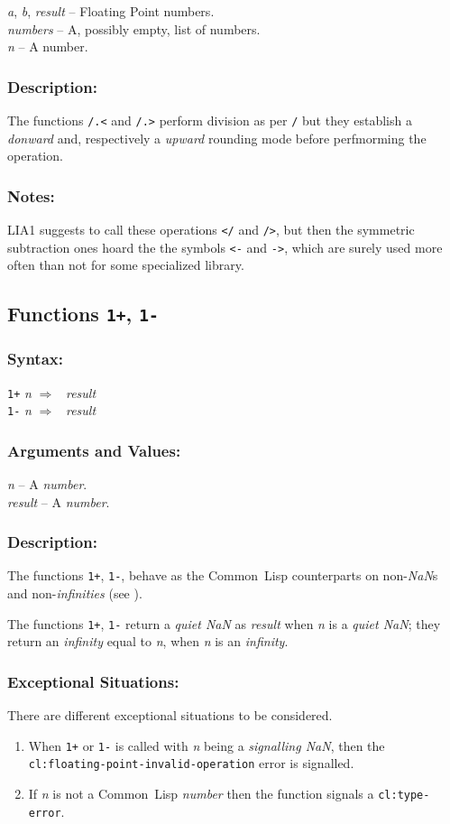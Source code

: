 \documentclass[10pt,fleqn]{article}
\newcommand{\CL}{\textsf{Common~Lisp}}
\newcommand{\code}[1]{\texttt{#1}}
\newcommand{\clieeeterm}[1]{\textit{#1}}
\newcommand{\varname}[1]{\textit{#1}}
\newcommand{\clterm}[1]{\textit{#1}}
\newcommand{\clname}[1]{\texttt{#1}}
\newcommand{\RArrow}{$\Rightarrow$}
\newcommand{\DDictionaryItem}[1]{\vspace*{6pt}\noindent\hrulefill\vspace*{-9pt}\subsection*{#1}}
\newcommand{\DSyntax}{\subsubsection*{Syntax:}}
\newcommand{\DArgsNValues}{\subsubsection*{Arguments and Values:}}
\newcommand{\DDescription}{\subsubsection*{Description:}}
\newcommand{\DExceptional}{\subsubsection*{Exceptional Situations:}}
\newcommand{\DNotes}{\subsubsection*{Notes:}}
\begin{document}
\varname{a}, \varname{b}, \varname{result} -- Floating Point numbers.\\
\varname{numbers} -- A, possibly empty, list of numbers.\\
\varname{n} -- A number.

\DDescription{}

The functions  \code{/.<} and \code{/.>} perform division as per \code{/}
but they establish a \emph{donward} and, respectively a
\emph{upward} rounding mode before perfmorming the operation.

\DNotes{}

LIA1 suggests to call these operations \code{</} and \code{/>}, but
then the symmetric subtraction ones hoard the the symbols \code{<-}
and \code{->}, which are surely used more often than not for some
specialized library.



\DDictionaryItem{Functions \code{1+}, \code{1-}}
\index{*!\code{1+}}
\index{*!\code{1-}}

\DSyntax{}

\code{1+} \varname{n} \RArrow ~ \varname{result}\\
\code{1-} \varname{n} \RArrow ~ \varname{result}\\

\DArgsNValues{}

\varname{n} -- A \clterm{number}.\\
\varname{result} -- A \clterm{number}.


\DDescription{}

The functions \code{1+}, \code{1-}, behave
as the \CL{} counterparts on non-\clieeeterm{NaN}s and
non-\clieeeterm{infinities} (see \cite{1996:ANSIHyperSpec}).

The functions \code{1+}, \code{1-} return a \clieeeterm{quiet NaN} as \varname{result}
when \varname{n} is a \clieeeterm{quiet NaN}; they return an
\clieeeterm{infinity} equal to \varname{n}, when \varname{n} is an
\clieeeterm{infinity}.

\DExceptional{}

There are different exceptional situations to be considered.

\begin{enumerate}
\item When \code{1+} or \code{1-} is called with \varname{n}
  being a \emph{signalling NaN}, then the\\
  \clname{cl:floating-point-invalid-operation} error is signalled.

\item If \varname{n} is not a \CL{} \clterm{number} then the function
  signals a \clname{cl:type-error}.
\end{enumerate}
\end{document}
